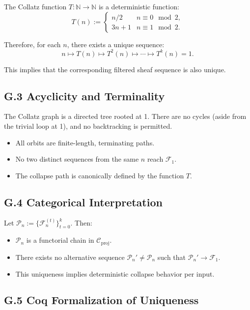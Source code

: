 \documentclass[11pt]{article}
\begin{document}
The Collatz function \( T: \mathbb{N} \to \mathbb{N} \) is a deterministic function:
\[
T(n) :=
\begin{cases}
n/2 & n \equiv 0 \mod 2, \\
3n+1 & n \equiv 1 \mod 2.
\end{cases}
\]

\noindent Therefore, for each \( n \), there exists a unique sequence:
\[
n \mapsto T(n) \mapsto T^2(n) \mapsto \cdots \mapsto T^k(n) = 1.
\]

This implies that the corresponding filtered sheaf sequence is also unique.

\subsection*{G.3 Acyclicity and Terminality}

The Collatz graph is a directed tree rooted at 1. There are no cycles (aside from the trivial loop at 1), and no backtracking is permitted.

\begin{itemize}
  \item All orbits are finite-length, terminating paths.
  \item No two distinct sequences from the same \( n \) reach \( \mathcal{F}_1 \).
  \item The collapse path is canonically defined by the function \( T \).
\end{itemize}

\subsection*{G.4 Categorical Interpretation}

Let \( \mathcal{P}_n := \{ \mathcal{F}_n^{(t)} \}_{t=0}^k \). Then:
\begin{itemize}
  \item \( \mathcal{P}_n \) is a functorial chain in \( \mathcal{C}_{\mathrm{proj}} \).
  \item There exists no alternative sequence \( \mathcal{P}_n' \neq \mathcal{P}_n \) such that \( \mathcal{P}_n' \to \mathcal{F}_1 \).
  \item This uniqueness implies deterministic collapse behavior per input.
\end{itemize}

\subsection*{G.5 Coq Formalization of Uniqueness}
\end{document}

